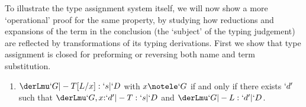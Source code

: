 \documentclass{lmcs}
\begin{document}
To illustrate the type assignment system itself, we will now show a more `operational' proof for the same property, by studying how reductions and expansions of the term in the conclusion (the `subject' of the typing judgement) are reflected by transformations of its typing derivations.
First we show that type assignment is closed for preforming or reversing both name and term substitution.

 \begin{lem} \label{lem:substitution}
 \begin{enumerate}
\firstitem \label{lem:substitution-name}
	$\derLmu `G |- T[`a/`b] : `s | `D $ with $`b \notele `D $ if and only $\derLmu `G |- T : `s | `b {:}`k,`D $ and $`D(`a) \leq_C `k$.
\item \label{lem:substitution-term}
	$\derLmu `G |- T[L/x] : `s | `D $ with $x\notele `G$ if and only if there exists $`d'$ such that $\derLmu `G,x{:}`d' |- T : `s | `D $ and $\derLmu `G |- L : `d' | `D $.
 \end{enumerate}
 \end{lem}
\end{document}
